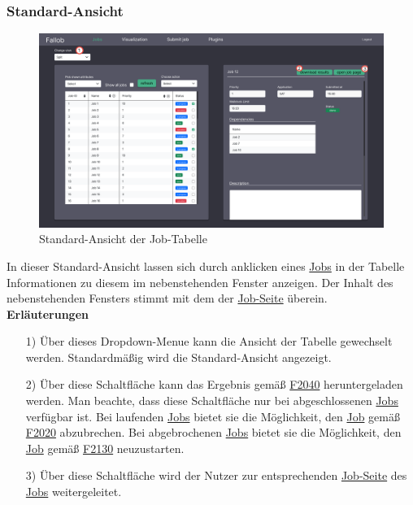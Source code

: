 \subsubsection{Standard-Ansicht}
\label{pages:job-table-default}
\begin{figure}[H]
    \centering
    \label{fig:job-table-default}
    \includegraphics[width=\textwidth]{images-interface/v6_interface/job_table_split_6.pdf}
    \caption{Standard-Ansicht der Job-Tabelle}
\end{figure}

In dieser Standard-Ansicht lassen sich durch anklicken eines \hyperref[B:Jobs]{Jobs} in der Tabelle Informationen zu diesem im nebenstehenden Fenster anzeigen.
Der Inhalt des nebenstehenden Fensters stimmt mit dem der \hyperref[pages:job-page]{Job-Seite} überein.\\

\textbf{Erläuterungen}
\begin{itemize}
    \item[1)] Über dieses \gls{Dropdown-Menue} kann die Ansicht der Tabelle gewechselt werden. Standardmäßig wird die Standard-Ansicht angezeigt.
    \item[2)] Über diese Schaltfläche kann das Ergebnis gemäß \hyperref[FA:Web-Interface:Herunterladen eines einzelnen Ergebnisses]{F2040} heruntergeladen werden. Man beachte, dass diese Schaltfläche nur bei abgeschlossenen \hyperref[B:Jobs]{Jobs} verfügbar ist. Bei laufenden \hyperref[B:Jobs]{Jobs} bietet sie die Möglichkeit, den \hyperref[B:Jobs]{Job} gemäß \hyperref[FA:Web-Interface:Abbruch eines einzelnen Jobs]{F2020} abzubrechen. Bei abgebrochenen \hyperref[B:Jobs]{Jobs} bietet sie die Möglichkeit, den \hyperref[B:Jobs]{Job} gemäß \hyperref[Neustart eines abgebrochenen Jobs]{F2130} neuzustarten.
   \item[3)] Über diese Schaltfläche wird der \gls{Nutzer} zur entsprechenden \hyperref[pages:job-page]{Job-Seite} des \hyperref[B:Jobs]{Jobs} weitergeleitet.
\end{itemize}

